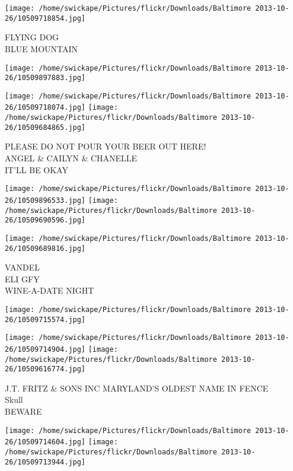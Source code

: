 \documentclass[10pt,letterpaper]{article}
\begin{document}
\vspace{0.25in}
\texttt{[image: /home/swickape/Pictures/flickr/Downloads/Baltimore 2013-10-26/10509718854.jpg]}

FLYING DOG\\
BLUE MOUNTAIN\\
\pagebreak

\texttt{[image: /home/swickape/Pictures/flickr/Downloads/Baltimore 2013-10-26/10509897883.jpg]}

\vspace{0.25in}
\texttt{[image: /home/swickape/Pictures/flickr/Downloads/Baltimore 2013-10-26/10509718074.jpg]}
\texttt{[image: /home/swickape/Pictures/flickr/Downloads/Baltimore 2013-10-26/10509684865.jpg]}

PLEASE DO NOT POUR YOUR BEER OUT HERE!\\
ANGEL \& CAILYN \& CHANELLE\\
IT'LL BE OKAY\\
\pagebreak

\texttt{[image: /home/swickape/Pictures/flickr/Downloads/Baltimore 2013-10-26/10509896533.jpg]}
\texttt{[image: /home/swickape/Pictures/flickr/Downloads/Baltimore 2013-10-26/10509690596.jpg]}

\vspace{0.25in}
\texttt{[image: /home/swickape/Pictures/flickr/Downloads/Baltimore 2013-10-26/10509689816.jpg]}

VANDEL\\
ELI GFY\\
WINE{-}A{-}DATE NIGHT\\
\pagebreak

\texttt{[image: /home/swickape/Pictures/flickr/Downloads/Baltimore 2013-10-26/10509715574.jpg]}

\vspace{0.25in}
\texttt{[image: /home/swickape/Pictures/flickr/Downloads/Baltimore 2013-10-26/10509714904.jpg]}
\texttt{[image: /home/swickape/Pictures/flickr/Downloads/Baltimore 2013-10-26/10509616774.jpg]}

J.T. FRITZ \& SONS INC MARYLAND'S OLDEST NAME IN FENCE\\
Skull\\
BEWARE\\
\pagebreak

\texttt{[image: /home/swickape/Pictures/flickr/Downloads/Baltimore 2013-10-26/10509714604.jpg]}
\texttt{[image: /home/swickape/Pictures/flickr/Downloads/Baltimore 2013-10-26/10509713944.jpg]}
\end{document}

